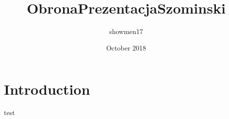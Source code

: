 \documentclass{article}
\title{ObronaPrezentacjaSzominski}
\author{showmen17 }
\date{October 2018}
\begin{document}
\maketitle

\section{Introduction}

test
\end{document}
